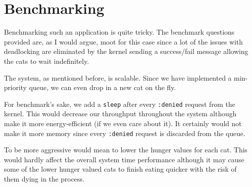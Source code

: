 \section{Benchmarking}
Benchmarking such an application is quite tricky. The benchmark questions provided are, as I would argue, moot for this case since a lot of the issues with deadlocking are eliminated by the kernel sending a success/fail message allowing the cats to wait indefinitely.

The system, as mentioned before, is scalable. Since we have implemented a min-priority queue, we can even drop in a new cat on the fly. 

For benchmark's sake, we add a \texttt{sleep} after every \texttt{:denied} request from the kernel. This would decrease our throughput throughout the system although make it more energy-efficient (if we even care about it). It certainly would not make it more memory since every \texttt{:denied} request is discarded from the queue.

To be more aggressive would mean to lower the hunger values for each cat. This would hardly affect the overall system time performance although it may cause some of the lower hunger valued cats to finish eating quicker with the risk of them dying in the process.